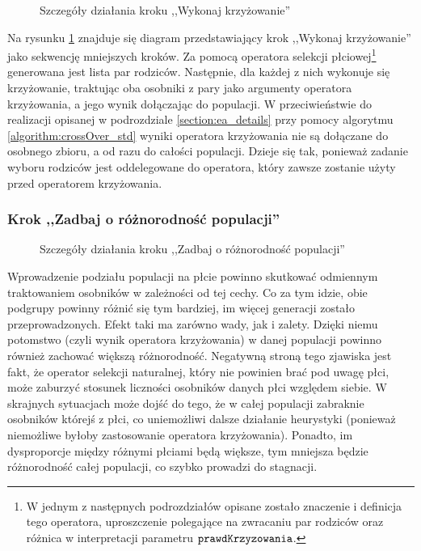 \documentclass[./FM_mgr.tex]{subfiles}
\begin{document}
\begin{figure}[H]
	\caption{Szczegóły działania kroku ,,Wykonaj krzyżowanie'' \label{figure:my_crossover}}
\end{figure}

Na rysunku \ref{figure:my_crossover} znajduje się diagram przedstawiający krok ,,Wykonaj krzyżowanie'' jako sekwencję mniejszych kroków. Za pomocą operatora selekcji płciowej\footnote{
	W jednym z następnych podrozdziałów opisane zostało znaczenie i definicja tego operatora, uproszczenie polegające na zwracaniu par rodziców oraz różnica w interpretacji parametru $\mathtt{prawdKrzyzowania}$. 
} generowana jest lista par rodziców. 
Następnie, dla każdej z nich wykonuje się krzyżowanie, traktując oba osobniki z pary jako argumenty operatora krzyżowania, a jego wynik dołączając do populacji. 
W przeciwieństwie do realizacji opisanej w podrozdziale \ref{section:ea_details} przy pomocy algorytmu \ref{algorithm:crossOver_std} wyniki operatora krzyżowania nie są dołączane do osobnego zbioru, a od razu do całości populacji. 
Dzieje się tak, ponieważ zadanie wyboru rodziców jest oddelegowane do operatora, który zawsze zostanie użyty przed operatorem krzyżowania.

\subsubsection{Krok ,,Zadbaj o różnorodność populacji''} \label{subsubsection:fixing}

\begin{figure}[H]
	\caption{Szczegóły działania kroku ,,Zadbaj o różnorodność populacji'' \label{figure:fixing}}
\end{figure}

Wprowadzenie podziału populacji na płcie powinno skutkować odmiennym traktowaniem osobników w zależności od tej cechy. 
Co za tym idzie, obie podgrupy powinny różnić się tym bardziej, im więcej generacji zostało przeprowadzonych.
Efekt taki ma zarówno wady, jak i zalety. 
Dzięki niemu potomstwo (czyli wynik operatora krzyżowania) w danej populacji powinno również zachować większą różnorodność. 
Negatywną stroną tego zjawiska jest fakt, że operator selekcji naturalnej, który nie powinien brać pod uwagę płci, może zaburzyć stosunek liczności osobników danych płci względem siebie. 
W skrajnych sytuacjach może dojść do tego, że w całej populacji zabraknie osobników którejś z płci, co uniemożliwi dalsze działanie heurystyki (ponieważ niemożliwe byłoby zastosowanie operatora krzyżowania). 
Ponadto, im dysproporcje między różnymi płciami będą większe, tym mniejsza będzie różnorodność całej populacji, co szybko prowadzi do stagnacji.
\end{document}
